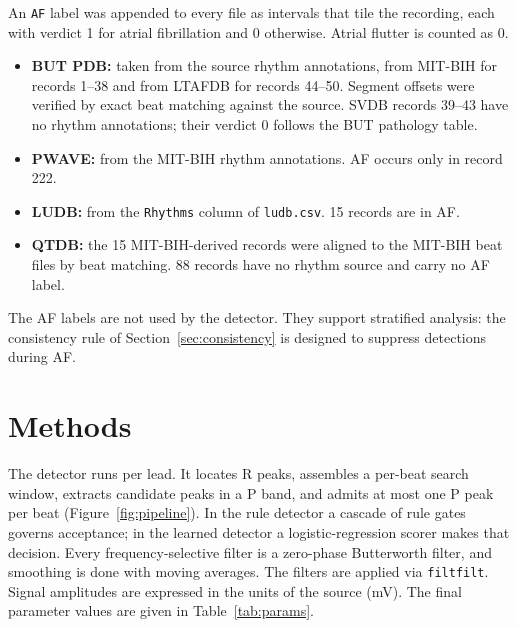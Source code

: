 \documentclass[11pt,a4paper]{article}
\newcommand{\code}[1]{\texttt{#1}}
\begin{document}
An \code{AF} label was appended to every file as intervals that tile the recording, each with verdict 1 for atrial fibrillation and 0 otherwise. Atrial flutter is counted as 0.
\begin{itemize}
\item \textbf{BUT PDB:} taken from the source rhythm annotations, from MIT-BIH for records 1--38 and from LTAFDB for records 44--50. Segment offsets were verified by exact beat matching against the source. SVDB records 39--43 have no rhythm annotations; their verdict 0 follows the BUT pathology table.
\item \textbf{PWAVE:} from the MIT-BIH rhythm annotations. AF occurs only in record 222.
\item \textbf{LUDB:} from the \code{Rhythms} column of \code{ludb.csv}. 15 records are in AF.
\item \textbf{QTDB:} the 15 MIT-BIH-derived records were aligned to the MIT-BIH beat files by beat matching. 88 records have no rhythm source and carry no AF label.
\end{itemize}
The AF labels are not used by the detector. They support stratified analysis: the consistency rule of Section~\ref{sec:consistency} is designed to suppress detections during AF.

\section{Methods}

The detector runs per lead. It locates R peaks, assembles a per-beat search window, extracts candidate peaks in a P band, and admits at most one P peak per beat (Figure~\ref{fig:pipeline}). In the rule detector a cascade of rule gates governs acceptance; in the learned detector a logistic-regression scorer makes that decision. Every frequency-selective filter is a zero-phase Butterworth filter, and smoothing is done with moving averages. The filters are applied via \code{filtfilt}. Signal amplitudes are expressed in the units of the source (mV). The final parameter values are given in Table~\ref{tab:params}.
\end{document}
